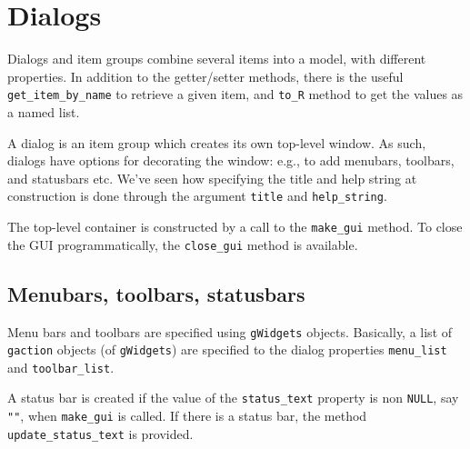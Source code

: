 \documentclass{article}
\newcommand{\code}[1]{\texttt{#1}} %
\newcommand{\function}[1]{\code{#1}} %
\newcommand{\constructor}[1]{\function{#1}\index{#1}}
\newcommand{\args}[1]{\code{#1}} %
\newcommand{\generic}[1]{\code{#1}} %
\newcommand{\meth}[1]{\generic{#1}}     %
\newcommand{\property}[1]{\code{#1}}     %
\newcommand{\pkg}[1]{\texttt{#1}}
\begin{document}
\section{Dialogs}
\label{sec:dialogs}

Dialogs and item groups combine several items into a model, with different
properties. In addition to the getter/setter methods, there is the
useful \meth{get\_item\_by\_name} to retrieve a given item, and
\meth{to\_R} method to get the values as a named list.

A dialog is an item group which creates its own top-level window. As
such, dialogs have options for decorating the window: e.g., to add
menubars, toolbars, and statusbars etc.
We've seen how specifying the title and help string at construction is
done through the argument \args{title} and \args{help\_string}.

The top-level container is constructed by a call to the
\meth{make\_gui} method. To close the GUI programmatically, the
\meth{close\_gui} method is available.

\subsection{Menubars, toolbars, statusbars}
\label{sec:menub-toolb-stat}

Menu bars and toolbars are specified using \pkg{gWidgets}
objects. Basically, a list of \constructor{gaction} objects (of
\pkg{gWidgets}) are specified to
the dialog properties \args{menu\_list} and \args{toolbar\_list}. 

\begin{Schunk}
\end{Schunk}
    

A status bar is created if the value of the
\property{status\_text} property is non \code{NULL}, say \code{""}, when \meth{make\_gui}
is called. If there is a status bar, the method
\meth{update\_status\_text} is provided.
\end{document}
